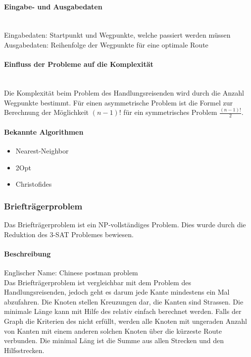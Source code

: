 	\paragraph{Eingabe- und Ausgabedaten}\mbox{}\\
	Eingabedaten: Startpunkt und Wegpunkte, welche passiert werden müssen\\
	Ausgabedaten: Reihenfolge der Wegpunkte für eine optimale Route

	\paragraph{Einfluss der Probleme auf die Komplexität}\mbox{}\\
	Die Komplexität beim Problem des Handlungsreisenden wird durch die Anzahl Wegpunkte bestimmt. Für einen asymmetrische Problem ist die Formel zur Berechnung der Möglichkeit $(n-1)!$ 
	für ein symmetrisches Problem $\frac{(n-1)!}{2}$.
	
	 \newpage
	\paragraph{Bekannte Algorithmen}\cite{tsp_algorithmen} \cite{tsp_semesterarbeit}
	\begin{itemize}
		\item Nearest-Neighbor
		\item 2Opt
		\item Christofides
	\end{itemize}

	\subsubsection{Briefträgerproblem}\label{chinese_postman}
	Das Briefträgerproblem ist ein NP-vollständiges Problem. Dies wurde durch die Reduktion des 3-SAT Problemes bewiesen.

	\paragraph{Beschreibung}
	Englischer Name: Chinese postman problem\\
	Das Briefträgerproblem ist vergleichbar mit dem Problem des Handlungsreisenden, jedoch geht es darum jede Kante mindestens ein Mal abzufahren. Die Knoten stellen Kreuzungen dar, die 
	Kanten sind Strassen. Die minimale Länge kann mit Hilfe des  relativ einfach berechnet werden. Falls der Graph die Kriterien des 
	 nicht erfüllt, werden alle Knoten mit ungeraden Anzahl von Kanten mit einem anderen solchen Knoten über die kürzeste Route verbunden. 
	Die minimal Läng ist die Summe aus allen Strecken und den Hilfsstrecken.
	\cite{pearson2004decision}

